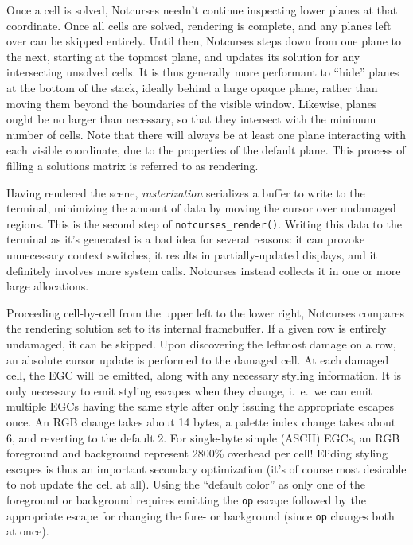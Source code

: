 \documentclass[letterpaper,10pt]{article}
\begin{document}
Once a cell is solved, Notcurses needn't continue inspecting lower planes at
that coordinate. Once all cells are solved, rendering is complete, and any
planes left over can be skipped entirely. Until then, Notcurses steps down from
one plane to the next, starting at the topmost plane, and updates its solution
for any intersecting unsolved cells. It is thus generally more performant to
``hide'' planes at the bottom of the stack, ideally behind a large opaque plane,
rather than moving them beyond the boundaries of the visible window. Likewise,
planes ought be no larger than necessary, so that they intersect with the
minimum number of cells. Note that there will always be at least one plane
interacting with each visible coordinate, due to the properties of the default
plane. This process of filling a solutions matrix is referred to as rendering.

Having rendered the scene, \textit{rasterization} serializes a buffer to write
to the terminal, minimizing the amount of data by moving the cursor over undamaged
regions. This is the second step of \texttt{notcurses\_render()}. Writing this
data to the terminal as it's generated is a bad idea for several reasons: it can
provoke unnecessary context switches, it results in partially-updated displays,
and it definitely involves more system calls. Notcurses instead collects it in
one or more large allocations.

Proceeding cell-by-cell from the upper left to the lower right, Notcurses
compares the rendering solution set to its internal framebuffer. If a given row
is entirely undamaged, it can be skipped. Upon discovering the leftmost damage
on a row, an absolute cursor update is performed to the damaged cell. At each
damaged cell, the EGC will be emitted, along with any necessary styling
information. It is only necessary to emit styling escapes when they change, i.\ e.\ we
can emit multiple EGCs having the same style after only issuing the appropriate
escapes once. An RGB change takes about 14 bytes, a palette index change
takes about 6, and reverting to the default 2. For single-byte simple (ASCII)
EGCs, an RGB foreground and background represent 2800\% overhead per cell!
Eliding styling escapes is thus an important secondary optimization (it's of
course most desirable to not update the cell at all). Using the ``default
color'' as only one of the foreground or background requires emitting the
\texttt{op} escape followed by the appropriate escape for changing the fore- or
background (since \texttt{op} changes both at once).
\end{document}
